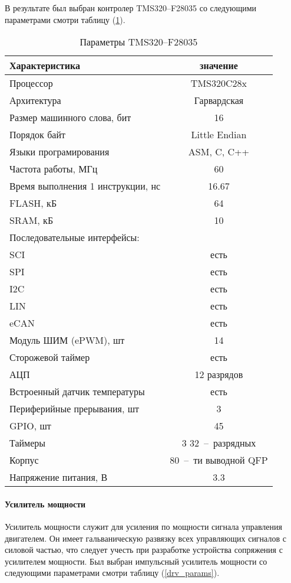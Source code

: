 В результате был выбран контролер TMS320--F28035 со следующими параметрами
смотри таблицу (\ref{mcu_params}).
\begin{table}[ht!]
    \centering
    \begin{tabular}{|l|c|}
        \hline
        Характеристика & значение \\
        \hline \hline
        Процессор & TMS320C28x \\
        Архитектура & Гарвардская \\
        Размер машинного слова, бит & 16 \\
        Порядок байт & Little Endian \\
        Языки програмирования & ASM, C, C++ \\
        Частота работы, МГц & 60 \\
        Время выполнения 1 инструкции, нс & 16.67 \\
        \hline
        FLASH, кБ & 64 \\
        SRAM,  кБ & 10 \\
        \hline
        Последовательные интерфейсы: & \\
        SCI  & есть \\
        SPI  & есть \\
        I2C  & есть \\
        LIN  & есть \\
        eCAN & есть \\
        \hline
        Модуль ШИМ (ePWM), шт & 14 \\
        \hline
        Сторожевой таймер & есть \\
        \hline
        АЦП & 12 разрядов \\
        \hline
        Встроенный датчик температуры & есть \\
        \hline
        Периферийные прерывания, шт & 3 \\
        \hline
        GPIO, шт  & 45 \\
        \hline
        Таймеры & 3 32~--~разрядных \\
        \hline
        Корпус & 80~--~ти выводной QFP \\
        \hline
        Напряжение питания, В & 3.3 \\
        \hline
    \end{tabular}
    \caption{Параметры TMS320--F28035}
    \label{mcu_params}
\end{table}


\paragraph{Усилитель мощности}
Усилитель мощности служит для усиления по мощности сигнала управления
двигателем. Он имеет гальваническую развязку всех управляющих сигналов с силовой
частью, что следует учесть при разработке устройства сопряжения с усилителем
мощности.
Был выбран импульсный усилитель мощности со следующими параметрами
смотри таблицу (\ref{drv_params}).

